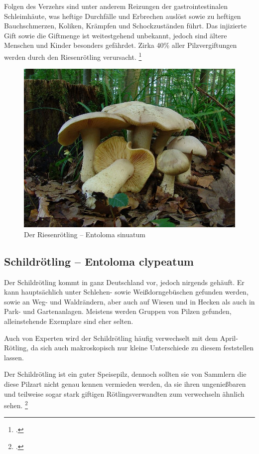 \documentclass[a4paper,abstracton]{scrreprt}
\begin{document}
Folgen des Verzehrs sind unter anderem Reizungen der gastrointestinalen Schleimhäute, was heftige Durchfälle und Erbrechen auslöst sowie zu heftigen Bauchschmerzen, Koliken, Krämpfen und Schockzuständen führt. Das injizierte Gift sowie die Giftmenge ist weitestgehend unbekannt, jedoch sind ältere Menschen und Kinder besonders gefährdet. Zirka 40\% aller Pilzvergiftungen werden durch den Riesenrötling verursacht.
\footcite{riesenroetling}

\begin{figure}[H]
\centering
\includegraphics[scale=0.2]{riesenroetling}
\caption{Der Riesenrötling -- Entoloma sinuatum }
\label{fig:riesenroetling}
\end{figure}

\subsection{Schildrötling -- Entoloma clypeatum}
\label{ref:schildroet}
Der Schildrötling kommt in ganz Deutschland vor, jedoch nirgends gehäuft. Er kann hauptsächlich unter Schlehen- sowie Weißdorngebüschen gefunden werden, sowie an Weg- und Waldrändern, aber auch auf Wiesen und in Hecken als auch in Park- und Gartenanlagen. Meistens werden Gruppen von Pilzen gefunden, alleinstehende Exemplare sind eher selten. 

Auch von Experten wird der Schildrötling häufig verwechselt mit dem April-Rötling, da sich auch makroskopisch nur kleine Unterschiede zu diesem feststellen lassen.

Der Schildrötling ist ein guter Speisepilz, dennoch sollten sie von Sammlern die diese Pilzart nicht genau kennen vermieden werden, da sie ihren ungenießbaren und teilweise sogar stark giftigen Rötlingsverwandten zum verwechseln ähnlich sehen.
\footcite{schildroetling}
\end{document}
